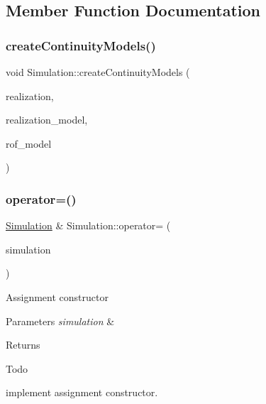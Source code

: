 \subsection{Member Function Documentation}
\mbox{\label{classSimulation_aa2e2863a0038345c46dd827b97008347}} 
\subsubsection{\texorpdfstring{create\+Continuity\+Models()}{createContinuityModels()}}
{\footnotesize\ttfamily void Simulation\+::create\+Continuity\+Models (\begin{DoxyParamCaption}\item[{unsigned long}]{realization,  }\item[{\mbox{\hyperlink{classContinuityModelRealization}{Continuity\+Model\+Realization}} $\ast$\&}]{realization\+\_\+model,  }\item[{\mbox{\hyperlink{classContinuityModelROF}{Continuity\+Model\+R\+OF}} $\ast$\&}]{rof\+\_\+model }\end{DoxyParamCaption})}

\mbox{\label{classSimulation_aa9ad48555e93d646d68c0df7a87e2356}} 
\subsubsection{\texorpdfstring{operator=()}{operator=()}}
{\footnotesize\ttfamily \mbox{\hyperlink{classSimulation}{Simulation}} \& Simulation\+::operator= (\begin{DoxyParamCaption}\item[{const \mbox{\hyperlink{classSimulation}{Simulation}} \&}]{simulation }\end{DoxyParamCaption})}

Assignment constructor 
\begin{DoxyParams}{Parameters}
{\em simulation} & \\
\hline
\end{DoxyParams}
\begin{DoxyReturn}{Returns}

\end{DoxyReturn}
\begin{DoxyRefDesc}{Todo}
\item[\mbox{\hyperlink{todo__todo000007}{Todo}}]implement assignment constructor. \end{DoxyRefDesc}
\mbox{\label{classSimulation_acfd5f3442b2e6c59eeed6a7b2fabb0f6}} 
